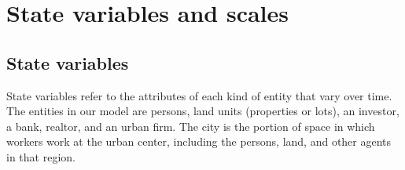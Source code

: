 \section{State variables and scales}
\subsection{State variables}
State variables refer to the attributes of each kind of entity that vary over time. %
The entities in our model are persons, land units (properties or lots), an investor, a bank,  realtor, and an urban firm. 
The city is the portion of space in which workers work at the urban center, including the persons, land, and other agents in that region. %



